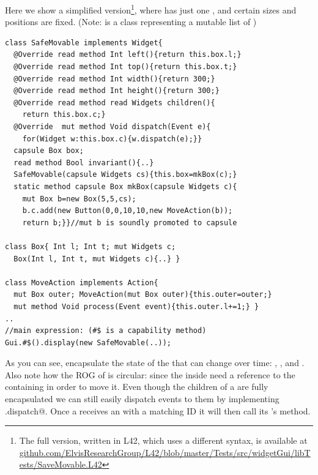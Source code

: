 

Here we show a simplified version\footnote{The full version, written in L42, which uses a different syntax, is available at \url{github.com/ElvisResearchGroup/L42/blob/master/Tests/src/widgetGui/libTests/SaveMovable.L42}}, where  \Q@SafeMovable@ has just one \Q@Button@, and certain sizes and positions are fixed. (Note: \Q@Widgets@ is a class representing a mutable list of \Q@mut@ \Q@Widget@s)
\begin{lstlisting}[mathescape=false]
class SafeMovable implements Widget{
  @Override read method Int left(){return this.box.l;}
  @Override read method Int top(){return this.box.t;}
  @Override read method Int width(){return 300;}
  @Override read method Int height(){return 300;}
  @Override read method read Widgets children(){
    return this.box.c;}
  @Override  mut method Void dispatch(Event e){
    for(Widget w:this.box.c){w.dispatch(e);}}
  capsule Box box;
  read method Bool invariant(){..}
  SafeMovable(capsule Widgets cs){this.box=mkBox(c);}
  static method capsule Box mkBox(capsule Widgets c){
    mut Box b=new Box(5,5,cs);
    b.c.add(new Button(0,0,10,10,new MoveAction(b));
    return b;}}//mut b is soundly promoted to capsule

class Box{ Int l; Int t; mut Widgets c;
  Box(Int l, Int t, mut Widgets c){..} }

class MoveAction implements Action{
  mut Box outer; MoveAction(mut Box outer){this.outer=outer;}
  mut method Void process(Event event){this.outer.l+=1;} }
..
//main expression: (#$ is a capability method)
Gui.#$().display(new SafeMovable(..));
\end{lstlisting}

As you can see, \Q@Box@es encapsulate the state of the \Q@SafeMovable@s that can change over time:
\Q@left@, \Q@top@, and \Q@children@. Also note how the ROG of \Q@Box@ is circular: since
the \Q@MoveAction@s inside \Q@Button@s need a reference to the containing \Q@Box@ in order to move it.
Even though the children of a \Q@SafeMovable@ are fully encapsulated we can still easily dispatch events to them by implementing \Q@Widget.dispatch@. Once a \Q@Button@ receives an \Q@Event@ with a matching ID it will then call its \Q@Action@'s \Q@process@ method. 

